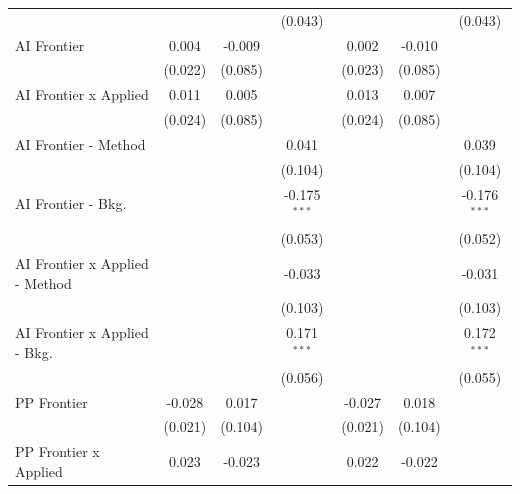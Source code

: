 \begin{tabular}{lcccccc}
                                  &                &              & (0.043)        &                &              & (0.043)\\   
   AI Frontier                    & 0.004          & -0.009       &                & 0.002          & -0.010       &   \\   
                                  & (0.022)        & (0.085)      &                & (0.023)        & (0.085)      &   \\   
   AI Frontier x Applied          & 0.011          & 0.005        &                & 0.013          & 0.007        &   \\   
                                  & (0.024)        & (0.085)      &                & (0.024)        & (0.085)      &   \\   
   AI Frontier - Method           &                &              & 0.041          &                &              & 0.039\\   
                                  &                &              & (0.104)        &                &              & (0.104)\\   
   AI Frontier - Bkg.             &                &              & -0.175$^{***}$ &                &              & -0.176$^{***}$\\   
                                  &                &              & (0.053)        &                &              & (0.052)\\   
   AI Frontier x Applied - Method &                &              & -0.033         &                &              & -0.031\\   
                                  &                &              & (0.103)        &                &              & (0.103)\\   
   AI Frontier x Applied - Bkg.   &                &              & 0.171$^{***}$  &                &              & 0.172$^{***}$\\   
                                  &                &              & (0.056)        &                &              & (0.055)\\   
   PP Frontier                    & -0.028         & 0.017        &                & -0.027         & 0.018        &   \\   
                                  & (0.021)        & (0.104)      &                & (0.021)        & (0.104)      &   \\   
   PP Frontier x Applied          & 0.023          & -0.023       &                & 0.022          & -0.022       &   \\   

\end{tabular}
